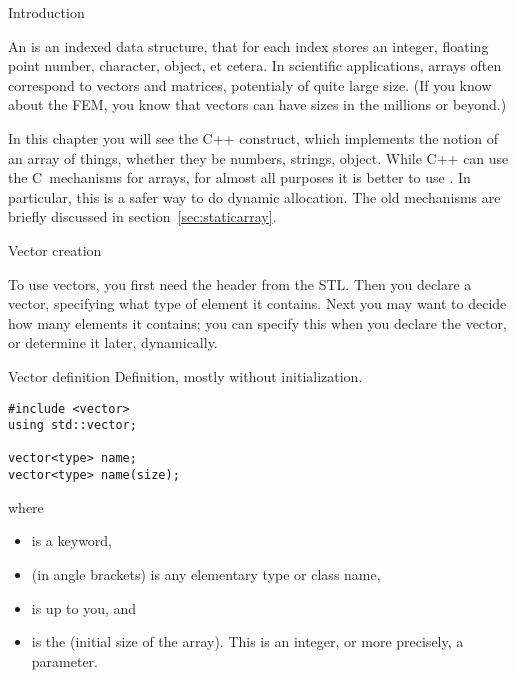 
 {Introduction}

An  is an indexed data structure, that for each
index stores an integer, floating point number, character,
object, et cetera.
In scientific applications, arrays often correspond to vectors and
matrices, potentialy of quite large size. (If you know about the
\acf{FEM}, you know that vectors can have sizes in the millions or beyond.)

In this chapter you will see the C++  construct,
which implements the notion of an array of things, whether they be
numbers, strings, object.
While C++ can use the C~mechanisms for arrays, for almost all purposes
it is better to use . In particular, this is a safer way to
do dynamic allocation. The old
mechanisms are briefly discussed in section~\ref{sec:staticarray}.

 {Vector creation}

To use vectors, you first need the  header from the
\ac{STL}. Then you declare a vector, specifying what type of element
it contains. Next you may want to decide how many elements it
contains; you can specify this when you declare the vector, or
determine it later, dynamically.

\begin{block}{Vector definition}
  \label{sl:vector-def}
  Definition, mostly without initialization.
\begin{lstlisting}
#include <vector>
using std::vector;

vector<type> name;
vector<type> name(size);
\end{lstlisting}
where
\begin{itemize}
\item {} is a keyword,
\item {} (in angle brackets) is any elementary type or class
  name,
\item {} is up to you, and
\item {} is the (initial size of the array). This is an integer,
  or more precisely, a  parameter.
\end{itemize}
\end{block}

